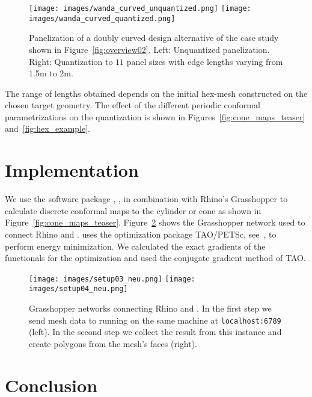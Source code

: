\documentclass[Thesis.tex]{subfiles}
\begin{document}
\begin{figure}[tbp]
  \centering
  \texttt{[image: images/wanda\_curved\_unquantized.png]}
  \texttt{[image: images/wanda\_curved\_quantized.png]}
  \caption{Panelization of a doubly curved design alternative of the
    case study shown in Figure~\ref{fig:overview02}. Left: Unquantized
    panelization.  Right: Quantization to $11$ panel sizes with edge
    lengths varying from 1.5m to 2m.}
  \label{fig:quantization}
\end{figure}

The range of lengths obtained depends on the initial hex-mesh
constructed on the chosen target geometry. The effect of the
different periodic conformal parametrizations on the quantization is
shown in Figures~\ref{fig:cone_maps_teaser} and~\ref{fig:hex_example}.


\section{Implementation}
\label{sec:implementation}

We use the software package \VaryLab, \cite{varylab-web-page}, in
combination with Rhino's Grasshopper to calculate discrete conformal
maps to the cylinder or cone as shown in Figure~\ref{fig:cone_maps_teaser}.
Figure~\ref{fig:grasshopper} shows the Grasshopper network used to
connect Rhino and \VaryLab.
\VaryLab uses the optimization package {\sc TAO/PETSc}, see~\cite{tao-user-ref, 
petsc-web-page, jpetsctao-web-page}, to perform energy
minimization.
%
We calculated the exact gradients of the functionals for the
optimization and used the conjugate gradient method of {\sc TAO}.

\begin{figure}[tb]
	\texttt{[image: images/setup03\_neu.png]}
	\hspace{0.06\textwidth}
	\texttt{[image: images/setup04\_neu.png]}
	\caption{Grasshopper networks connecting Rhino and
          \VaryLab{}. In the first step we send mesh data to \VaryLab{}
          running on the same machine at {\tt localhost:6789}
          (left). In the second step we collect the result from this
          \VaryLab{} instance and create polygons from the mesh's
          faces (right).}
	\label{fig:grasshopper}
\end{figure}


\section{Conclusion}
\label{sec:conclusion}
\end{document}
